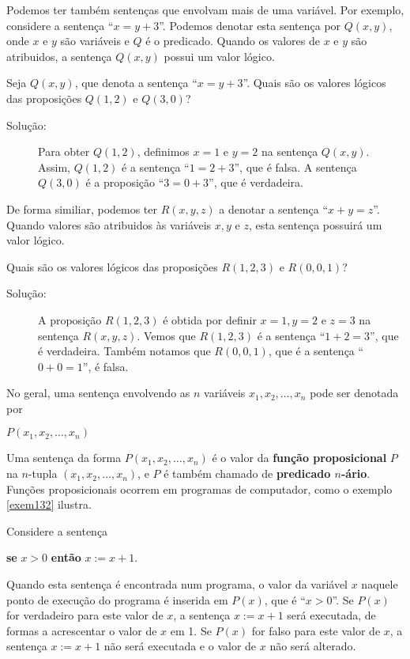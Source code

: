 Podemos ter também sentenças que envolvam mais de uma variável. Por exemplo,
considere a sentença ``$x = y + 3$''. Podemos denotar esta sentença por
$Q(x,y)$, onde $x$ e $y$ são variáveis e $Q$ é o predicado. Quando os valores de
$x$ e $y$ são atribuidos, a sentença $Q(x,y)$ possui um valor lógico.

\begin{exmp}
\label{exem130}
Seja $Q(x,y)$, que denota a sentença ``$x = y + 3$''. Quais são os valores
lógicos das proposições $Q(1,2)$ e $Q(3,0)$?
\end{exmp}
\begin{description}
\item[Solução:] Para obter $Q(1,2)$, definimos $x = 1$ e $y = 2$ na sentença
$Q(x,y)$. Assim, $Q(1,2)$ é a sentença ``$1=2+3$'', que é falsa. A sentença
$Q(3,0)$ é a proposição ``$3 = 0+3$'', que é verdadeira.
\end{description}

De forma similiar, podemos ter $R(x,y,z)$ a denotar a sentença ``$x + y = z$''.
Quando valores são atribuidos às variáveis $x,y$ e $z$, esta sentença possuirá
um valor lógico.

\begin{exmp}
\label{exem131}
Quais são os valores lógicos das proposições $R(1,2,3)$ e $R(0,0,1)$?
\end{exmp}
\begin{description}
\item[Solução:] A proposição $R(1,2,3)$ é obtida por definir $x=1, y=2$ e $z=3$
na sentença $R(x,y,z)$. Vemos que $R(1,2,3)$ é a sentença ``$1 + 2 = 3$'', que é
verdadeira. Também notamos que $R(0,0,1)$, que é a sentença ``$0+0=1$'', é
falsa.
\end{description}

No geral, uma sentença envolvendo as $n$ variáveis $x_1, x_2, \ldots, x_n$ pode
ser denotada por 
\begin{center}$P(x_1, x_2, \ldots, x_n)$\end{center}

Uma sentença da forma $P(x_1, x_2, \ldots, x_n)$ é o valor da \textbf{função
proposicional} $P$ na $n$-tupla $(x_1, x_2, \ldots, x_n)$, e $P$ é também
chamado de \textbf{predicado $n$-ário}. Funções proposicionais ocorrem em
programas de computador, como o exemplo \ref{exem132} ilustra.

\begin{exmp}
\label{exem132}
Considere a sentença
\begin{center} \textbf{se} $x > 0$ \textbf{então} $x := x + 1$.\end{center}
Quando esta sentença é encontrada num programa, o valor da variável $x$ naquele
ponto de execução do programa é inserida em $P(x)$, que é ``$x>0$''. Se $P(x)$
for verdadeiro para este valor de $x$, a sentença $x := x + 1$ será executada,
de formas a acrescentar o valor de $x$ em 1. Se $P(x)$ for falso para este valor
de $x$, a sentença $x := x + 1$ não será executada e o valor de $x$ não será
alterado.
\end{exmp}

